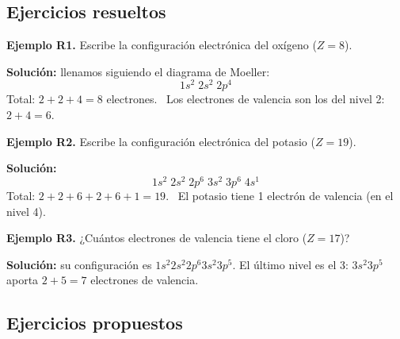 \documentclass[12pt, letterpaper]{article}
\begin{document}
\subsection{Ejercicios resueltos}

\textbf{Ejemplo R1.} Escribe la configuración electrónica del oxígeno ($Z = 8$).

\begin{cuadrosolucion}
  \textbf{Solución:} llenamos siguiendo el diagrama de Moeller:
  $$1s^{2} \; 2s^{2} \; 2p^{4}$$
  Total: $2 + 2 + 4 = 8$ electrones. \checkmark \ Los electrones de valencia son los del nivel 2: $2 + 4 = 6$.
\end{cuadrosolucion}

\textbf{Ejemplo R2.} Escribe la configuración electrónica del potasio ($Z = 19$).

\begin{cuadrosolucion}
  \textbf{Solución:}
  $$1s^{2} \; 2s^{2} \; 2p^{6} \; 3s^{2} \; 3p^{6} \; 4s^{1}$$
  Total: $2 + 2 + 6 + 2 + 6 + 1 = 19$. \checkmark \ El potasio tiene 1 electrón de valencia (en el nivel 4).
\end{cuadrosolucion}

\textbf{Ejemplo R3.} ¿Cuántos electrones de valencia tiene el cloro ($Z = 17$)?

\begin{cuadrosolucion}
  \textbf{Solución:} su configuración es $1s^{2} 2s^{2} 2p^{6} 3s^{2} 3p^{5}$. El último nivel es el 3: $3s^{2}3p^{5}$ aporta $2 + 5 = 7$ electrones de valencia.
\end{cuadrosolucion}

\subsection{Ejercicios propuestos}
\end{document}
